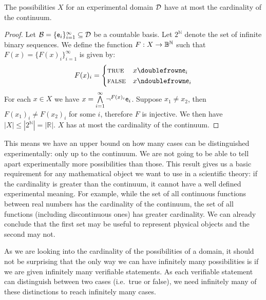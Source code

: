 \documentclass[11pt,letterpaper,fleqn]{memoir} %
\begin{document}
\begin{mathSection}
	\begin{thrm}
		The possibilities $X$ for an experimental domain $\edomain$ have at most the cardinality of the continuum.
	\end{thrm}
	
	\begin{proof}
		Let $\basis = \{\obs[e]_i\}_{i=1}^{\infty} \subseteq \edomain$ be a countable basis. Let $2^{\mathbb{N}}$ denote the set of infinite binary sequences. We define the function $F:X\to\Bool^{\mathbb{N}}$ such that $F(x) = \{F(x)_i\}_{i=1}^{\infty}$ is given by: 
		$$
		F(x)_i = 
		\begin{cases}
		\TRUE & x \comp \obs[e]_i \\
		\FALSE & x \ncomp \obs[e]_i
		\end{cases}
		$$
		For each $x \in X$ we have $x = \bigAND\limits_{i=1}^{\infty} \NOT^{F(x)_i} \obs[e]_i$. Suppose $x_1 \neq x_2$, then $F(x_1)_i \neq F(x_2)_i$ for some $i$, therefore $F$ is injective. We then have $|X| \leq |2^{\mathbb{N}}|=|\mathbb{R}|$. $X$ has at most the cardinality of the continuum.
	\end{proof}
\end{mathSection}

This means we have an upper bound on how many cases can be distinguished experimentally: only up to the continuum. We are not going to be able to tell apart experimentally more possibilities than those. This result gives us a basic requirement for any mathematical object we want to use in a scientific theory: if the cardinality is greater than the continuum, it cannot have a well defined experimental meaning. For example, while the set of all continuous functions between real numbers has the cardinality of the continuum, the set of all functions (including discontinuous ones) has greater cardinality. We can already conclude that the first set may be useful to represent physical objects and the second may not.

As we are looking into the cardinality of the possibilities of a domain, it should not be surprising that the only way we can have infinitely many possibilities is if we are given infinitely many verifiable statements. As each verifiable statement can distinguish between two cases (i.e.~true or false), we need infinitely many of these distinctions to reach infinitely many cases.
\end{document}

